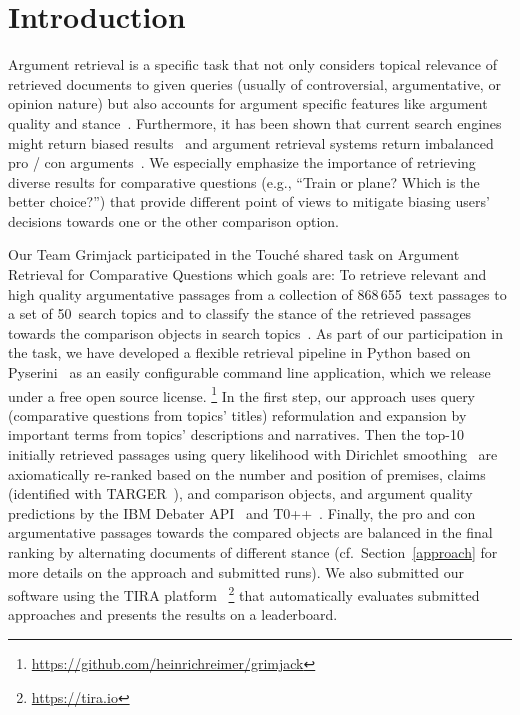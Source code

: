 \section{Introduction}\label{intro}

Argument retrieval is a specific task that not only considers topical relevance of retrieved documents to given queries (usually of controversial, argumentative, or opinion nature) but also accounts for argument specific features like argument quality and stance~\cite{BondarenkoFBGAPBSWPH2020, BondarenkoGFBAPBSWPH2021}.  
Furthermore, it has been shown that current search engines might return biased results~\cite{ShahB2022} and argument retrieval systems return imbalanced pro / con arguments~\cite{CherumanalSSC2021}.
We especially emphasize the importance of retrieving diverse results for comparative questions (e.g., ``Train or plane? Which is the better choice?'') that provide different point of views to mitigate biasing users' decisions towards one or the other comparison option.

Our Team Grimjack participated in the Touch{\'e} shared task on Argument Retrieval for Comparative Questions which goals are: \Ni To retrieve relevant and high quality argumentative passages from a collection of 868\,655~text passages to a set of 50~search topics and \Nii to classify the stance of the retrieved passages towards the comparison objects in search topics~\cite{BondarenkoFKSGBPBSWPH2022}.
As part of our participation in the task, we have developed a flexible retrieval pipeline in Python based on Pyserini~\cite{LinMLYPN2021} as an easily configurable command line application, which we release under a free open source license.%
\footnote{\url{https://github.com/heinrichreimer/grimjack}}
In the first step, our approach uses query (comparative questions from topics' titles) reformulation and expansion by important terms from topics' descriptions and narratives. Then the top-10 initially retrieved passages using query likelihood with Dirichlet smoothing~\cite{ZhaiL2001} are axiomatically re-ranked based on the number and position of premises, claims (identified with TARGER~\cite{ChernodubOHBHBP2019}), and comparison objects, and argument quality predictions by the IBM Debater API~\cite{ToledoGCFVLJAS2019} and T0++~\cite{SanhWRBSACSLRDBXTSSKCNDCJWMSYPBWNRSSFFTBGBWR2021}.
Finally, the pro and con argumentative passages towards the compared objects are balanced in the final ranking by alternating documents of different stance (cf.\ Section~\ref{approach} for more details on the approach and submitted runs). We also submitted our software using the TIRA platform~\cite{PotthastGWS2019}%
\footnote{\url{https://tira.io}} that automatically evaluates submitted approaches and presents the results on a leaderboard.


